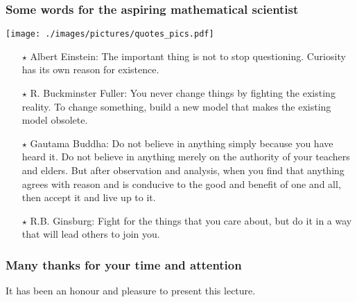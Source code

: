 \documentclass[10pt]{beamer}
\begin{document}
\begin{frame}
  \frametitle{Some words for the aspiring mathematical scientist}


\begin{center}
\vspace{-.4cm}
{\texttt{[image: ./images/pictures/quotes\_pics.pdf]}}
\end{center}

\vspace{-.4cm}

\begin{exampleblock}{}

\small 
\begin{itemize} 

\item[$\star$] {\sc Albert Einstein:} The important thing is not to
  stop questioning. Curiosity has its own reason for existence.

\item[$\star$] {\sc R. Buckminster Fuller:} You never change things by
  fighting the existing reality. To change something, build a new
  model that makes the existing model obsolete.

\item[$\star$] {\sc Gautama Buddha:} Do not believe in anything simply
  because you have heard it.  Do not believe in anything merely on the
  authority of your teachers and elders. But after observation and
  analysis, when you find that anything agrees with reason and is
  conducive to the good and benefit of one and all, then accept it and
  live up to it.


\item[$\star$] {\sc R.B. Ginsburg:} Fight for the things that you care
  about, but do it in a way that will lead others to join you.


\end{itemize}

\end{exampleblock}{}

\end{frame}


\begin{frame}
\frametitle{Many thanks for your time and attention}

\begin{center}
 It has been an honour and pleasure to present this lecture. 
\vspace{-.25cm}
\end{center}


\end{frame}  
\end{document}
